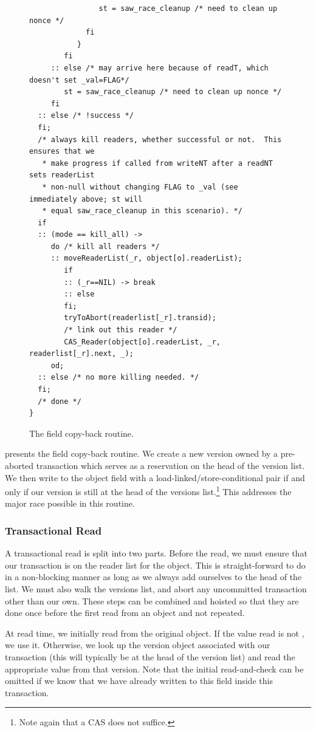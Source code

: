 \begin{figure}
\begin{verbatim}
                st = saw_race_cleanup /* need to clean up nonce */
             fi
           }
        fi
     :: else /* may arrive here because of readT, which doesn't set _val=FLAG*/
        st = saw_race_cleanup /* need to clean up nonce */
     fi
  :: else /* !success */
  fi;
  /* always kill readers, whether successful or not.  This ensures that we
   * make progress if called from writeNT after a readNT sets readerList
   * non-null without changing FLAG to _val (see immediately above; st will
   * equal saw_race_cleanup in this scenario). */
  if
  :: (mode == kill_all) ->
     do /* kill all readers */
     :: moveReaderList(_r, object[o].readerList);
        if
        :: (_r==NIL) -> break
        :: else
        fi;
        tryToAbort(readerlist[_r].transid);
        /* link out this reader */
        CAS_Reader(object[o].readerList, _r, readerlist[_r].next, _);
     od;
  :: else /* no more killing needed. */
  fi;
  /* done */
}
\end{verbatim}
\caption{The field copy-back routine.}\label{fig:copyback}
\end{figure}
 presents the field copy-back routine.  We create a
new version owned by a pre-aborted transaction which serves as a
reservation on the head of the version list.  We then write to the
object field with a load-linked/store-conditional pair if and only if
our version is still at the head of the versions list.\footnote{Note
  again that a CAS does not suffice.}  This addresses
the major race possible in this routine.

\subsubsection{Transactional Read}
A transactional read is split into two parts.  Before the read, we
must ensure that our transaction is on the reader list for the
object.  This is straight-forward to do in a non-blocking manner as
long as we always add ourselves to the head of the list.  We must also
walk the versions list, and abort any uncommitted transaction other
than our own.  These steps can be combined and hoisted so that they
are done once before the first read from an object and not repeated.

At read time, we initially read from the original object.  If the
value read is not \FLAG, we use it.  Otherwise, we look up the version
object associated with our transaction (this will typically be at the
head of the version list) and read the appropriate value from that
version.  Note that the initial read-and-check can be omitted if we
know that we have already written to this field inside this transaction.

